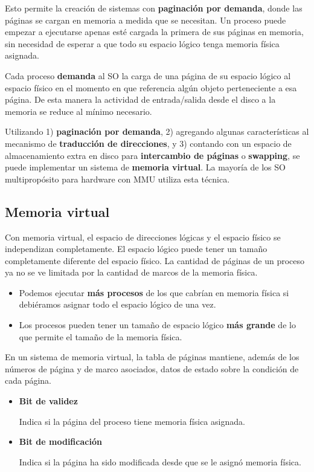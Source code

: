 \documentclass[spanish,a4paper,]{article}
\providecommand{\tightlist}{%
  \setlength{\itemsep}{0pt}\setlength{\parskip}{0pt}}
\begin{document}
Esto permite la creación de sistemas con \textbf{paginación por
demanda}, donde las páginas se cargan en memoria a medida que se
necesitan. Un proceso puede empezar a ejecutarse apenas esté cargada la
primera de sus páginas en memoria, sin necesidad de esperar a que todo
su espacio lógico tenga memoria física asignada.

Cada proceso \textbf{demanda} al SO la carga de una página de su espacio
lógico al espacio físico en el momento en que referencia algún objeto
perteneciente a esa página. De esta manera la actividad de
entrada/salida desde el disco a la memoria se reduce al mínimo
necesario.

Utilizando 1) \textbf{paginación por demanda}, 2) agregando algunas
características al mecanismo de \textbf{traducción de direcciones}, y 3)
contando con un espacio de almacenamiento extra en disco para
\textbf{intercambio de páginas} o \textbf{swapping}, se puede
implementar un sistema de \textbf{memoria virtual}. La mayoría de los SO
multipropósito para hardware con MMU utiliza esta técnica.

\hypertarget{memoria-virtual}{%
\subsection{Memoria virtual}\label{memoria-virtual}}

Con memoria virtual, el espacio de direcciones lógicas y el espacio
físico se independizan completamente. El espacio lógico puede tener un
tamaño completamente diferente del espacio físico. La cantidad de
páginas de un proceso ya no se ve limitada por la cantidad de marcos de
la memoria física.

\begin{itemize}
\tightlist
\item
  Podemos ejecutar \textbf{más procesos} de los que cabrían en memoria
  física si debiéramos asignar todo el espacio lógico de una vez.
\item
  Los procesos pueden tener un tamaño de espacio lógico \textbf{más
  grande} de lo que permite el tamaño de la memoria física.
\end{itemize}

En un sistema de memoria virtual, la tabla de páginas mantiene, además
de los números de página y de marco asociados, datos de estado sobre la
condición de cada página.

\begin{itemize}
\item
  \textbf{Bit de validez}

  Indica si la página del proceso tiene memoria física asignada.
\item
  \textbf{Bit de modificación}

  Indica si la página ha sido modificada desde que se le asignó memoria
  física.
\end{itemize}
\end{document}
